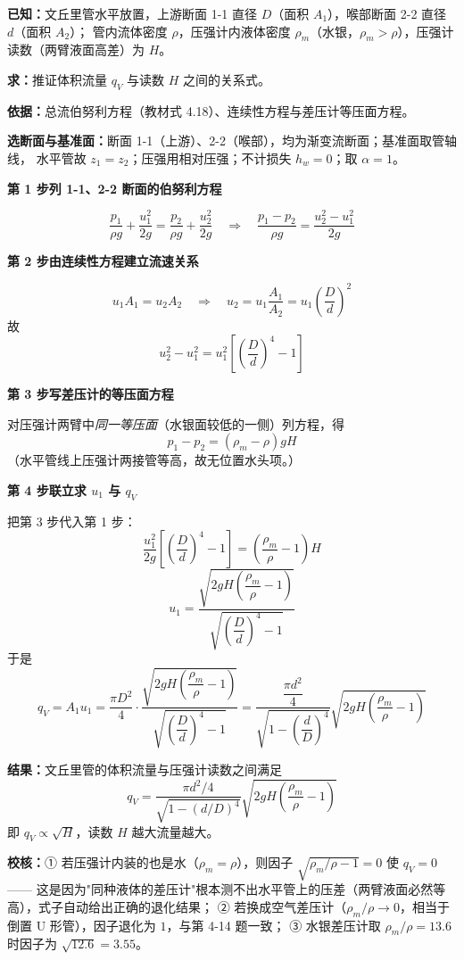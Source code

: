 \begin{jie}
\textbf{已知：}文丘里管水平放置，上游断面 1-1 直径 $D$（面积 $A_1$），喉部断面 2-2 直径 $d$（面积 $A_2$）；
管内流体密度 $\rho$，压强计内液体密度 $\rho_m$（水银，$\rho_m>\rho$），压强计读数（两臂液面高差）为 $H$。

\textbf{求：}推证体积流量 $q_V$ 与读数 $H$ 之间的关系式。

\textbf{依据：}总流伯努利方程（教材式 4.18）、连续性方程与差压计等压面方程。

\textbf{选断面与基准面：}断面 1-1（上游）、2-2（喉部），均为渐变流断面；基准面取管轴线，
水平管故 $z_1=z_2$；压强用相对压强；不计损失 $h_w=0$；取 $\alpha=1$。

\textbf{第 1 步\quad 列 1-1、2-2 断面的伯努利方程}

\[ \frac{p_1}{\rho g}+\frac{u_1^2}{2g}=\frac{p_2}{\rho g}+\frac{u_2^2}{2g}
   \quad\Longrightarrow\quad
   \frac{p_1-p_2}{\rho g}=\frac{u_2^2-u_1^2}{2g} \]

\textbf{第 2 步\quad 由连续性方程建立流速关系}

\[ u_1A_1=u_2A_2\quad\Longrightarrow\quad u_2=u_1\frac{A_1}{A_2}=u_1\left(\frac{D}{d}\right)^2 \]
故
\[ u_2^2-u_1^2=u_1^2\left[\left(\frac{D}{d}\right)^4-1\right] \]

\textbf{第 3 步\quad 写差压计的等压面方程}

对压强计两臂中\emph{同一等压面}（水银面较低的一侧）列方程，得
\[ p_1-p_2=(\rho_m-\rho)gH \]
（水平管线上压强计两接管等高，故无位置水头项。）

\textbf{第 4 步\quad 联立求 $u_1$ 与 $q_V$}

把第 3 步代入第 1 步：
\[ \frac{u_1^2}{2g}\left[\left(\frac{D}{d}\right)^4-1\right]=\left(\frac{\rho_m}{\rho}-1\right)H \]
\[ u_1=\frac{\sqrt{2gH\left(\dfrac{\rho_m}{\rho}-1\right)}}{\sqrt{\left(\dfrac{D}{d}\right)^4-1}} \]
于是
\[ q_V=A_1u_1=\frac{\pi D^2}{4}\cdot\frac{\sqrt{2gH\left(\dfrac{\rho_m}{\rho}-1\right)}}{\sqrt{\left(\dfrac{D}{d}\right)^4-1}}
   =\frac{\dfrac{\pi d^2}{4}}{\sqrt{1-\left(\dfrac{d}{D}\right)^4}}\sqrt{2gH\left(\frac{\rho_m}{\rho}-1\right)} \]

\textbf{结果：}文丘里管的体积流量与压强计读数之间满足
\[ q_V=\frac{\pi d^2/4}{\sqrt{1-(d/D)^4}}\sqrt{2gH\left(\frac{\rho_m}{\rho}-1\right)} \]
即 $q_V\propto\sqrt{H}$，读数 $H$ 越大流量越大。

\textbf{校核：}① 若压强计内装的也是水（$\rho_m=\rho$），则因子 $\sqrt{\rho_m/\rho-1}=0$ 使 $q_V=0$——
这是因为"同种液体的差压计"根本测不出水平管上的压差（两臂液面必然等高），式子自动给出正确的退化结果；
② 若换成空气差压计（$\rho_m/\rho\to0$，相当于倒置 U 形管），因子退化为 $1$，与第 4-14 题一致；
③ 水银差压计取 $\rho_m/\rho=13.6$ 时因子为 $\sqrt{12.6}=3.55$。
\end{jie}


